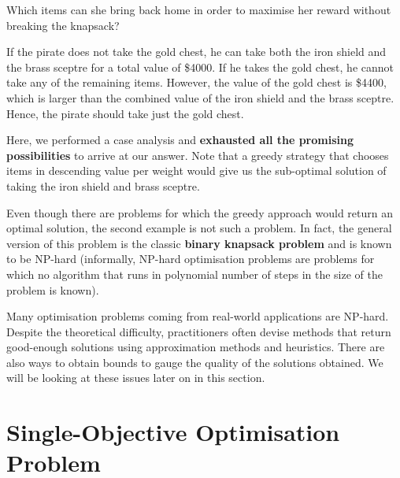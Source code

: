 \begin{enumerate}
  Which items can she bring back home in order to maximise her reward without breaking the knapsack?

  If the pirate does not take the gold chest, he
  can take both the iron shield and the brass sceptre for a total value
  of \$4000. If he takes the gold chest, he cannot take any of the
  remaining items. However, the value of the gold chest is \$4400, which
  is larger than the combined value of the iron shield and the brass
  sceptre. Hence, the pirate should take just the gold chest.

  Here, we performed a case analysis and \textbf{exhausted all the
  promising possibilities} to arrive at our answer. Note that a greedy
  strategy that chooses items in descending value per weight would give
  us the sub-optimal solution of taking the iron shield and brass
  sceptre. 
 \end{enumerate} 
  Even though there are problems for which the greedy approach
  would return an optimal solution, the second example is not such a problem.
  In fact, the general version of this problem is the classic \textbf{binary
  knapsack problem} and is known to be NP-hard  (informally, NP-hard
  optimisation problems are problems for which no algorithm that runs in
  polynomial number of steps in the size of the problem is known).

  Many optimisation problems coming from real-world applications are
  NP-hard. Despite the theoretical difficulty, practitioners often
  devise methods that return good-enough solutions using approximation
  methods and heuristics. There are also ways to obtain bounds to gauge
  the quality of the solutions obtained. We will be looking at these
  issues later on in this section.
\section{Single-Objective Optimisation
Problem}

